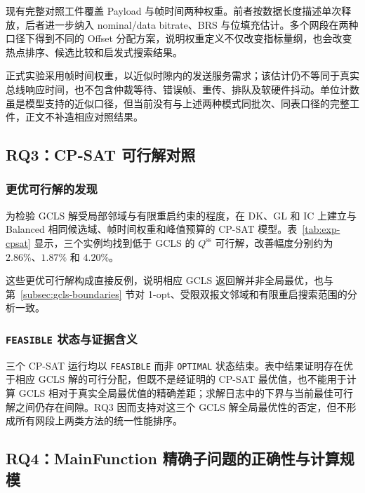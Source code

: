\documentclass[UTF8,a4paper,twoside,zihao=-4]{ctexart}
\numberwithin{equation}{section}
\numberwithin{figure}{section}
\numberwithin{table}{section}
\theoremstyle{definition}
\numberwithin{algocf}{section}
\begin{document}
现有完整对照工件覆盖 Payload 与帧时间两种权重。前者按数据长度描述单次释放，后者进一步纳入 nominal/data bitrate、BRS 与位填充估计。多个网段在两种口径下得到不同的 Offset 分配方案，说明权重定义不仅改变指标量纲，也会改变热点排序、候选比较和启发式搜索结果。

正式实验采用帧时间权重，以近似时隙内的发送服务需求；该估计仍不等同于真实总线响应时间，也不包含仲裁等待、错误帧、重传、排队及软硬件抖动。单位计数虽是模型支持的近似口径，但当前没有与上述两种模式同批次、同表口径的完整工件，正文不补造相应对照结果。

\FloatBarrier

\subsection{RQ3：CP-SAT 可行解对照}
\label{subsec:exp-rq3}

\subsubsection{更优可行解的发现}
\label{subsubsec:exp-rq3-better-feasible}

为检验 GCLS 解受局部邻域与有限重启约束的程度，在 DK、GL 和 IC 上建立与 Balanced 相同候选域、帧时间权重和峰值预算的 CP-SAT 模型。表~\ref{tab:exp-cpsat} 显示，三个实例均找到低于 GCLS 的 $Q^{\mathrm{ss}}$ 可行解，改善幅度分别约为 $2.86\%$、$1.87\%$ 和 $4.20\%$。



这些更优可行解构成直接反例，说明相应 GCLS 返回解并非全局最优，也与第~\ref{subsec:gcls-boundaries} 节对 1-opt、受限双报文邻域和有限重启搜索范围的分析一致。

\subsubsection{\texorpdfstring{\texttt{FEASIBLE}}{FEASIBLE} 状态与证据含义}
\label{subsubsec:exp-rq3-status}

三个 CP-SAT 运行均以 \texttt{FEASIBLE} 而非 \texttt{OPTIMAL} 状态结束。表中结果证明存在优于相应 GCLS 解的可行分配，但既不是经证明的 CP-SAT 最优值，也不能用于计算 GCLS 相对于真实全局最优值的精确差距；求解日志中的下界与当前最佳可行解之间仍存在间隙。RQ3 因而支持对这三个 GCLS 解全局最优性的否定，但不形成所有网段上两类方法的统一性能排序。

\subsection{RQ4：MainFunction 精确子问题的正确性与计算规模}
\label{subsec:exp-rq4}
\end{document}
